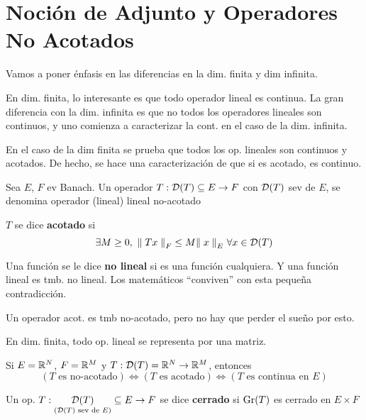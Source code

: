 \section{Noción de Adjunto y Operadores No Acotados}

Vamos a poner énfasis en las diferencias en la dim. finita y dim infinita.

En dim. finita, lo interesante es que todo operador lineal es continua. La gran diferencia con la dim. infinita es que no todos los operadores lineales son continuos, y uno comienza a caracterizar la cont. en el caso de la dim. infinita.

En el caso de la dim finita se prueba que todos los op. lineales son continuos y acotados. De hecho, se hace una caracterización de que si es acotado, es continuo.

\begin{defn}
Sea $E$, $F$ ev Banach. Un operador $T: \cd(T) \subseteq E \to F$ con $\cd(T)$ sev de $E$, se denomina operador (lineal) lineal no-acotado
\end{defn}

\begin{defn}
$T$ se dice \textbf{acotado} si $$\exists M \geq 0, \ \norm[F]{Tx} \leq M \norm[E]{x} \ \forall x \in \cd(T)$$
\end{defn}

Una función se le dice \textbf{no lineal} si es una función cualquiera. Y una función lineal es tmb. no lineal. Los matemáticos ``conviven'' con esta pequeña contradicción.

\begin{note}
Un operador acot. es tmb no-acotado, pero no hay que perder el sueño por esto.
\end{note}

En dim. finita, todo op. lineal se representa por una matriz.

\begin{exer}
Si $E = \rr[N]$, $F = \rr[M]$ y $T:\cd(T) = \rr[N] \to \rr[M]$, entonces $$(T \text{ es no-acotado} )  \iff (T \text{ es acotado} ) \iff (T \text{ es continua en $E$} )$$
\end{exer}

\begin{defn}
Un op. $T: \underset{\text{($\cd(T)$ sev de $E$)}}{\cd(T)} \subseteq E \to F$ se dice \textbf{cerrado} si $ \gr (T)$ es cerrado en $E \times F$
\end{defn}


